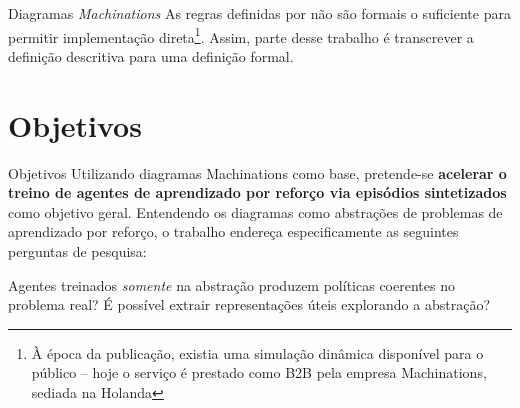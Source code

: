 \documentclass[aspectratio=169]{beamer}
\begin{document}
\begin{frame}{Diagramas \textit{Machinations}}
    As regras definidas por \citeauthor{machinations} não são formais o suficiente para permitir implementação direta\footnote{À época da publicação, existia uma simulação dinâmica disponível para o público -- hoje o serviço é prestado como B2B pela empresa Machinations, sediada na Holanda}. Assim, parte desse trabalho é transcrever a definição descritiva para uma definição formal.
\end{frame}

\section{Objetivos}

\begin{frame}{Objetivos}
    Utilizando diagramas Machinations como base, pretende-se \textbf{acelerar o treino de agentes de aprendizado por reforço via episódios sintetizados} como objetivo geral. Entendendo os diagramas como abstrações de problemas de aprendizado por reforço, o trabalho endereça especificamente as seguintes perguntas de pesquisa:
    \begin{outline}
        \1 Agentes treinados \textit{somente} na abstração produzem políticas coerentes no problema real?
        \1 É possível extrair representações úteis explorando a abstração?
    \end{outline}
\end{frame}
\end{document}
